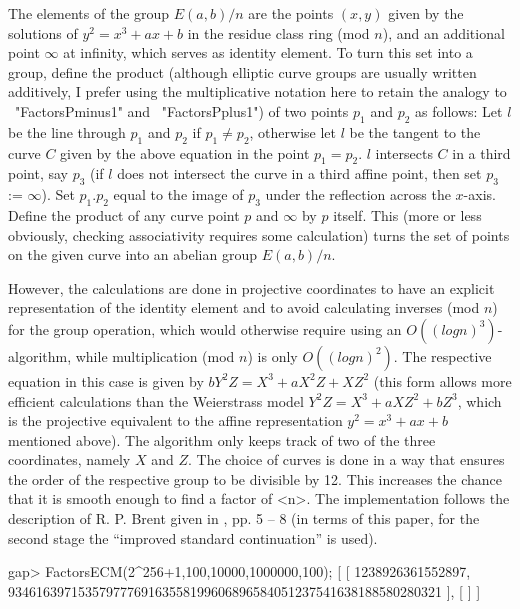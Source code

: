 The elements of the group $E(a,b)/n$ are the points $(x,y)$ given by the
solutions of $y^2 = x^3 + ax + b$ in the residue class ring (mod $n$),
and an additional point $\infty$ at infinity, which serves as
identity element.
To turn this set into a group, define the product
(although elliptic curve groups are usually written additively,
I prefer using the multiplicative notation here to retain the analogy
to ~"FactorsPminus1" and ~"FactorsPplus1") of two points
$p_1$ and $p_2$ as follows:
Let $l$ be the line through $p_1$ and $p_2$ if $p_1 \neq p_2$,
otherwise let $l$ be the tangent to the curve $C$ given by the
above equation in the point $p_1 = p_2$.
$l$ intersects $C$ in a third point, say $p_3$ 
(if $l$ does not intersect the curve in a
third affine point, then set $p_3$ := $\infty$).
Set $p_1.p_2$ equal to the image of $p_3$ under
the reflection across the $x$-axis.
Define the product of any curve point $p$ and $\infty$ by $p$ itself.
This (more or less obviously, checking associativity requires some
calculation) turns the set of points on the given curve
into an abelian group $E(a,b)/n$.

However, the calculations are done in
projective coordinates to have an explicit representation of the
identity element and to avoid calculating inverses (mod $n$)
for the group operation, which would otherwise require using an
$O((log n)^3)$-algorithm, while multiplication (mod $n$) is only
$O((log n)^2)$. The respective equation in this case is given by
$bY^2Z = X^3 + aX^2Z + XZ^2$ (this form allows more efficient
calculations than the
Weierstrass model 
$Y^2Z = X^3 + aXZ^2 + bZ^3$, which is the projective equivalent to
the affine representation $y^2 = x^3 + ax + b$ mentioned above).
The algorithm only keeps track of two of the three coordinates,
namely $X$ and $Z$.
The choice of curves is done in a way that ensures the order of
the respective group to be divisible by 12. This increases the
chance that it is smooth enough to find a factor of <n>.
The implementation follows the description of R. P. Brent given in
\cite{Brent96}, pp. 5 -- 8 (in terms of this paper,
for the second stage the ``improved standard continuation'' is used).

\beginexample
gap> FactorsECM(2^256+1,100,10000,1000000,100);
[ [ 1238926361552897, 
      93461639715357977769163558199606896584051237541638188580280321 ], [  ] ]
\endexample


